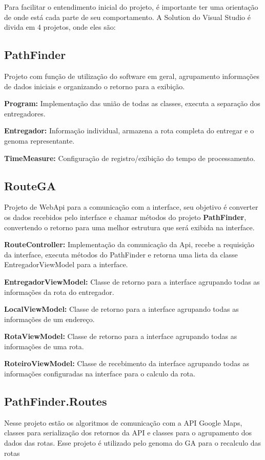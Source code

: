 Para facilitar o entendimento inicial do projeto, é importante ter uma orientação de onde está cada parte de seu comportamento. A Solution do Visual Studio é divida em 4 projetos, onde eles são:

\subsection{PathFinder}
Projeto com função de utilização do software em geral, agrupamento informações de dados iniciais e organizando o retorno para a exibição.

\textbf{Program:} Implementação das união de todas as classes, executa a separação dos entregadores.

\textbf{Entregador:} Informação individual, armazena a rota completa do entregar e o genoma representante.

\textbf{TimeMeasure:} Configuração de registro/exibição do tempo de processamento.

\subsection{RouteGA}
Projeto de WebApi para a comunicação com a interface, seu objetivo é converter os dados recebidos pelo interface e chamar métodos do projeto \textbf{PathFinder}, convertendo o retorno para uma melhor estrutura que será exibida na interface.

\textbf{RouteController:} Implementação da comunicação da Api, recebe a requisição da interface, executa métodos do PathFinder e retorna uma lista da classe EntregadorViewModel para a interface.

\textbf{EntregadorViewModel:} Classe de retorno para a interface agrupando todas as informações da rota do entregador.

\textbf{LocalViewModel:} Classe de retorno para a interface agrupando todas as informações de um endereço.

\textbf{RotaViewModel:} Classe de retorno para a interface agrupando todas as informações de uma rota.

\textbf{RoteiroViewModel:} Classe de recebimento da interface agrupando todas as informações configuradas na interface para o calculo da rota.

\subsection{PathFinder.Routes}
Nesse projeto estão os algoritmos de comunicação com a  API Google Maps, classes para serialização dos retornos da API e classes para o agrupamento dos dados das rotas. Esse projeto é utilizado pelo genoma do GA para o recalculo das rotas

